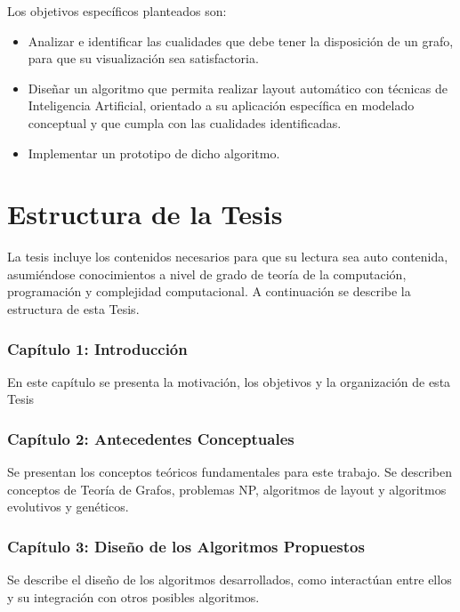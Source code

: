 Los objetivos específicos planteados son:
\begin{itemize}
\item Analizar e identificar las cualidades que debe tener la disposición de un grafo, para que su visualización sea  satisfactoria.%

\item Diseñar un algoritmo que permita realizar layout automático con técnicas de Inteligencia Artificial, orientado a su aplicación específica en modelado conceptual y que cumpla con las cualidades identificadas.
\item Implementar un prototipo de dicho algoritmo.%

\end{itemize}


\section{Estructura de la Tesis}
La tesis incluye los contenidos necesarios para que su lectura sea auto contenida, asumiéndose conocimientos a nivel de grado de teoría de la computación, programación y complejidad computacional. A continuación se describe la estructura de esta Tesis.

\subsubsection{Capítulo 1: Introducción}
En este capítulo se presenta la motivación, los objetivos y la organización de esta Tesis

\subsubsection{Capítulo 2: Antecedentes Conceptuales}
Se presentan los conceptos teóricos fundamentales para este trabajo. Se describen conceptos de Teoría de Grafos, problemas NP, algoritmos de layout y algoritmos evolutivos y genéticos.

\subsubsection{Capítulo 3: Diseño de los Algoritmos Propuestos}
Se describe el diseño de los algoritmos desarrollados, como interactúan entre ellos y su integración con otros posibles algoritmos.

